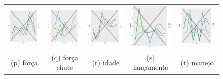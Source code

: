 \documentclass[doc,apacite,oneside,a4paper,12pt]{apa6}
\begin{document}
\begin{figure}
\begin{tabular}{ccccc}
  \includegraphics[width=25mm]{forca_result_trans} & \includegraphics[width=25mm]{forcachute_result_trans}  &   \includegraphics[width=25mm]{idade_result_trans} &
  \includegraphics[width=25mm]{lancamento_result_trans}  & \includegraphics[width=25mm]{manejo_result_trans}  \\
 \scriptsize{(p) força} & \scriptsize{(q) força chute } & \scriptsize{(r) idade} & \scriptsize{(s) lançamento} & \scriptsize{(t) manejo}\\[3pt]
 

\end{tabular}
\end{figure}
\end{document}
